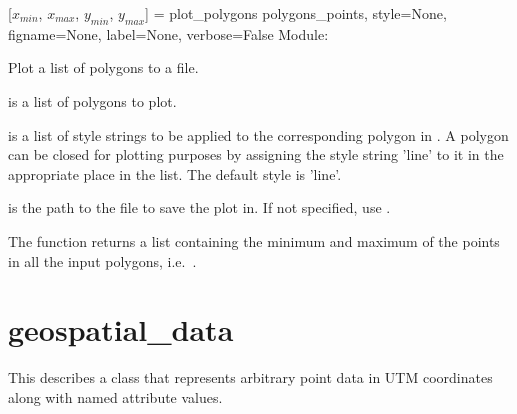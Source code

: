 \documentclass{manual}
\begin{document}
\begin{funcdesc}{[$x_{min}$, $x_{max}$, $y_{min}$, $y_{max}$] = plot_polygons}
                               {polygons_points, style=None,
                                figname=None, label=None, verbose=False}
Module: 

Plot a list of polygons to a file.

 is a list of polygons to plot.

 is a list of style strings to be applied to the corresponding polygon
in . A polygon can be closed for plotting purposes by assigning
the style string 'line' to it in the appropriate place in the  list.
The default style is 'line'.

 is the path to the file to save the plot in.  If not specified, use
.

The function returns a list containing the minimum and maximum of the points in all the
input polygons, i.e.\ .
\end{funcdesc}




\pagebreak
\section{geospatial_data}
\label{sec:geospatial}

This describes a class that represents arbitrary point data in UTM
coordinates along with named attribute values.

\end{document}
